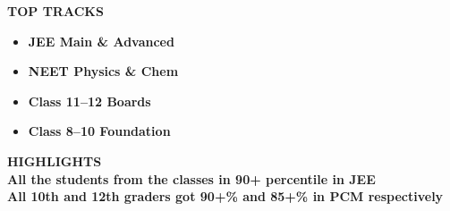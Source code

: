 \documentclass[11pt,a4paper]{article}
\begin{document}
\begin{tcolorbox}[colback=pale_blue!35, colframe=sky_blue!20, arc=14pt, boxrule=1pt, top=8pt, bottom=8pt, left=10pt, right=10pt]
    \textcolor{sky_blue}{\fontsize{21}{24}\selectfont\textbf{\faRocket \quad TOP TRACKS}}\\[0.35em]
    \begin{itemize}[label=\textcolor{vibrant_orange}{\Large\faCheckCircle}, itemsep=5pt, leftmargin=1.4em]
        \item {\fontsize{16}{20}\selectfont\textbf{\textcolor{deep_navy}{JEE Main \& Advanced}}}
        \item {\fontsize{16}{20}\selectfont\textbf{\textcolor{deep_navy}{NEET Physics \& Chem}}}
        \item {\fontsize{16}{20}\selectfont\textbf{\textcolor{deep_navy}{Class 11--12 Boards}}}
        \item {\fontsize{16}{20}\selectfont\textbf{\textcolor{deep_navy}{Class 8--10 Foundation}}}
    \end{itemize}
\end{tcolorbox}

\vspace{5pt}

\vspace{1cm}
\begin{tcolorbox}[
  enhanced,
  colback=yellow!10,
  colframe=vibrant_orange!90!deep_navy,
  arc=10pt,
  boxrule=1.2pt,
  drop shadow,
  top=8pt,bottom=8pt,left=10pt,right=10pt
]
  \textcolor{vibrant_orange}{\Large\textbf{\faBolt \quad HIGHLIGHTS}}\\[0.35em]
  {\fontsize{18}{22}\selectfont\textbf{\textcolor{deep_navy}{All the students from the classes in 90+ percentile in JEE}}}\\[0.2em]
  {\fontsize{18}{22}\selectfont\textbf{\textcolor{deep_navy}{All 10th and 12th graders got 90+\% and 85+\% in PCM respectively}}}
\end{tcolorbox}

\vspace{1cm}
\end{document}
